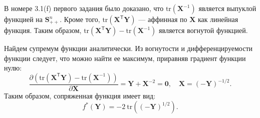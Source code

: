 \documentclass[a4paper,12pt]{article}
\begin{document}
\begin{enumerate}
		В номере 3.1(f) первого задания было доказано, что $\text{tr}(\mathbf{X}^{-1})$ является выпуклой функцией на $\mathbf{S}^n_{++}$. Кроме того, $\text{tr}(\mathbf{X}^\mathsf{T}\mathbf{Y})$ --- аффинная по $\mathbf{X}$ как линейная функция. Таким образом, $\text{tr}(\mathbf{X}^\mathsf{T}\mathbf{Y}) - \text{tr}(\mathbf{X}^{-1})$ является вогнутой функцией.
		
		Найдем супремум функции аналитически. Из вогнутости и дифференцируемости функции следует, что можно найти ее максимум, приравняв градиент функции нулю:
		$$
		\frac{\partial (\text{tr}(\mathbf{X}^\mathsf{T}\mathbf{Y}) - \text{tr}(\mathbf{X}^{-1}))}{\partial \mathbf{X}} = \mathbf{Y} + \mathbf{X}^{-2} = \mathbf{0},\quad \mathbf{X} = (-\mathbf{Y})^{-1/2}.
		$$
 		Таким образом, сопряженная функция имеет вид:
 		$$
 		f^*(\mathbf{Y}) = -2~ \text{tr}((-\mathbf{Y})^{1/2}).
 		$$
		
	\end{enumerate}
	
\end{document}
